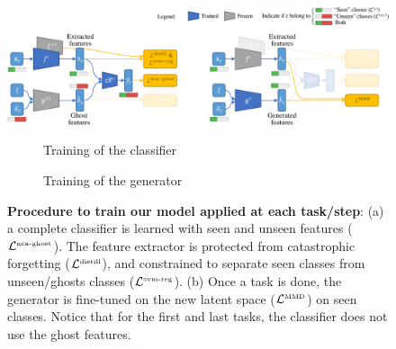 \begin{figure}
    \centering
    \includegraphics[width=\linewidth]{images/ghost/model.pdf}
    \begin{subfigure}{.5\textwidth}
        \vspace{2mm}
        \centering
        \caption{Training of the classifier}
        \label{fig:ghost_training_cls}
    \end{subfigure}%
    \begin{subfigure}{.5\textwidth}
        \vspace{2mm}
        \centering
        \caption{Training of the generator}
        \label{fig:ghost_training_gen}
    \end{subfigure}
    \caption{\textbf{Procedure to train our model applied at each task/step}: (a) a complete classifier is learned with seen and unseen features ($\mathcal{L}^\text{\tiny{nca-ghost}}$). The feature extractor is protected from catastrophic forgetting ($\mathcal{L}^\text{\tiny{distill}}$), and constrained to separate seen classes from unseen/ghosts classes ($\mathcal{L}^\text{\tiny{svm-reg}}$). (b) Once a task is done, the generator is fine-tuned on the new latent space ($\mathcal{L}^\text{\tiny{MMD}}$) on seen classes. Notice that for the first and last tasks, the classifier does not use the ghost features.}
    \label{fig:ghost_training_procedure}
\end{figure}

